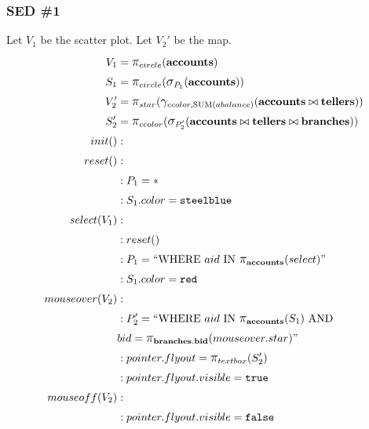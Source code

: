 \subsubsection{SED \#1}
Let $V_1$ be the scatter plot.
Let $V_2'$ be the map.
\begin{align*}
	V_1&= \mathlarger{\pi}_{circle}(\bf{accounts})\\
	S_1&= \mathlarger{\pi}_{circle}(\mathlarger{\sigma}_{P_1}(\bf{accounts}))\\
	V_2'&= \mathlarger{\pi}_{star}(\mathlarger{\gamma}_{ccolor, \text{SUM}(abalance)}(\bf{accounts}\bowtie{}\bf{tellers}))\\
	S_2'&= \mathlarger{\pi}_{ccolor}(\mathlarger{\sigma}_{P_2'}(\bf{accounts}\bowtie{}\bf{tellers}\bowtie{}\bf{branches}))\\
	init()&:\\
	reset()&:\\
	&: P_1 = *\\
	&: S_1.color = \texttt{steelblue}\\
	select(V_1)&:\\
	&: reset()\\
	&: P_1 = ``\text{WHERE}~aid~\text{IN}~\mathlarger{\pi}_{\bf{accounts}}(select)"\\
	&: S_1.color = \texttt{red}\\
	mouseover(V_2)&:\\
	&: P_2' = ``\text{WHERE}~aid~\text{IN}~\mathlarger{\pi}_{\bf{accounts}}(S_1)~\text{AND}\\&bid=\mathlarger{\pi}_{\bf{branches.bid}}(mouseover.star)"\\
	&: pointer.flyout = \mathlarger{\pi}_{textbox}(S_2')\\
	&: pointer.flyout.visible = \texttt{true}\\
	mouseoff(V_2)&:\\
	&: pointer.flyout.visible = \texttt{false}\\
\end{align*}
